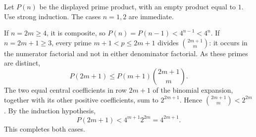 Let $P(n)$ be the displayed prime product, with an empty product equal to $1$. Use strong induction. The cases $n=1,2$ are immediate.

If $n=2m\ge4$, it is composite, so $P(n)=P(n-1)<4^{n-1}<4^n$. If $n=2m+1\ge3$, every prime $m+1<p\le2m+1$ divides $\binom{2m+1}{m}$: it occurs in the numerator factorial and not in either denominator factorial. As these primes are distinct,
\[
P(2m+1)\le P(m+1)\binom{2m+1}{m}.
\]
The two equal central coefficients in row $2m+1$ of the binomial expansion, together with its other positive coefficients, sum to $2^{2m+1}$. Hence $\binom{2m+1}{m}<2^{2m}$. By the induction hypothesis,
\[
P(2m+1)<4^{m+1}2^{2m}=4^{2m+1}.
\]
This completes both cases.
